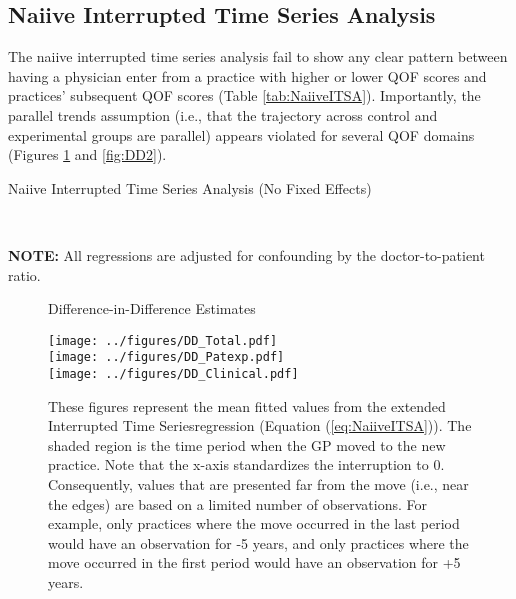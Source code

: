 \documentclass[11pt]{article}
\begin{document}
\subsection{Naiive Interrupted Time Series Analysis}

The naiive interrupted time series analysis fail to show any clear pattern between having a physician enter from a practice with higher or lower QOF scores and practices' subsequent QOF scores (Table \ref{tab:NaiiveITSA}). Importantly, the parallel trends assumption (i.e., that the trajectory across control and experimental groups are parallel) appears violated for several QOF domains (Figures \ref{fig:DD1} and \ref{fig:DD2}).


\begin{landscape}
  \begin{table}[htp]
  \caption{Naiive Interrupted Time Series Analysis (No Fixed Effects)}
    \begin{threeparttable}
      \\
    \begin{tablenotes}
    \footnotesize
    \textbf{NOTE:} All regressions are adjusted for confounding by the doctor-to-patient ratio.
    \end{tablenotes}
    \end{threeparttable}
    \label{tab:NaiiveITSA}
  \end{table}
\end{landscape}



\begin{figure}[htp]
\centering
\caption{Difference-in-Difference Estimates}
\texttt{[image: ../figures/DD\_Total.pdf]}\\
\texttt{[image: ../figures/DD\_Patexp.pdf]}\\
\texttt{[image: ../figures/DD\_Clinical.pdf]}\\


\caption*{These figures represent the mean fitted values from the extended Interrupted Time Seriesregression (Equation (\ref{eq:NaiiveITSA})). The shaded region is the time period when the GP moved to the new practice. Note that the x-axis standardizes the interruption to 0. Consequently, values that are presented far from the move (i.e., near the edges) are based on a limited number of observations. For example, only practices where the move occurred in the last period would have an observation for -5 years, and only practices where the move occurred in the first period would have an observation for +5 years.}
\label{fig:DD1}
\end{figure}
\end{document}
